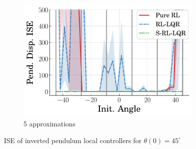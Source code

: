 \begin{figure}
    \hfill
    \begin{subfigure}[b]{0.32\textwidth}
        \centering
        \includegraphics[width=\textwidth]{figures/figures_Interpretability/Mean_ISE_Inverted_Pendulum-v0_cubic_5_bins_near_equil/Mean_ISE_Inverted_Pendulum-v0_cubic_Pend_Disp_5_bins.pdf}
        \caption{5 approximations}
        \label{subfig_chap5:near_equil_5_bins_unclipped}
    \end{subfigure}
    \caption{ISE of inverted pendulum local controllers for $\theta(0)=45^\circ$}
    \label{fig_chap5:Mean_ISE_near_equil}
\end{figure}
%

